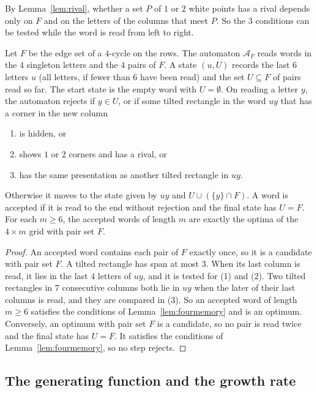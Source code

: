 By Lemma~\ref{lem:rival}, whether a set $P$ of $1$ or $2$ white points has a
rival depends only on $F$ and on the letters of the columns that meet $P$. So
the $3$ conditions can be tested while the word is read from left to right.

\begin{proposition}\label{prop:fourautomaton}
Let $F$ be the edge set of a $4$-cycle on the rows. The automaton $\mathcal A_F$
reads words in the $4$ singleton letters and the $4$ pairs of $F$. A state
$(u,U)$ records the last $6$ letters $u$ (all letters, if fewer than $6$ have
been read) and the set $U\subseteq F$ of pairs read so far. The start state is
the empty word with $U=\emptyset$. On reading a letter $y$, the automaton
rejects if $y\in U$, or if some tilted rectangle in the word $uy$ that has a
corner in the new column
\begin{enumerate}[(1)]
\item is hidden, or
\item shows $1$ or $2$ corners and has a rival, or
\item has the same presentation as another tilted rectangle in $uy$.
\end{enumerate}
Otherwise it moves to the state given by $uy$ and $U\cup(\{y\}\cap F)$. A word
is accepted if it is read to the end without rejection and the final state has
$U=F$. For each $m\ge6$, the accepted words of length $m$ are exactly the optima
of the $4\times m$ grid with pair set $F$.
\end{proposition}

\begin{proof}
An accepted word contains each pair of $F$ exactly once, so it is a candidate
with pair set $F$. A tilted rectangle has span at most $3$. When its last
column is read, it lies in the last $4$ letters of $uy$, and it is tested for
(1) and (2). Two tilted rectangles in $7$ consecutive columns both lie in $uy$
when the later of their last columns is read, and they are compared in (3). So
an accepted word of length $m\ge6$ satisfies the conditions of
Lemma~\ref{lem:fourmemory} and is an optimum. Conversely, an optimum with pair
set $F$ is a candidate, so no pair is read twice and the final state has $U=F$.
It satisfies the conditions of Lemma~\ref{lem:fourmemory}, so no step rejects.
\end{proof}

\subsection{The generating function and the growth rate}

